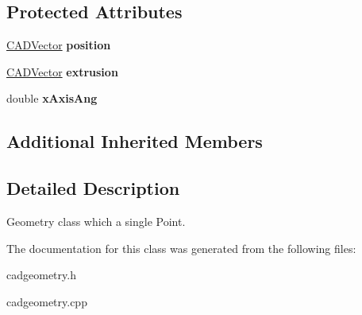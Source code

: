 \subsection*{Protected Attributes}
\begin{DoxyCompactItemize}
\item 
\hyperlink{class_c_a_d_vector}{C\+A\+D\+Vector} {\bfseries position}\hypertarget{class_c_a_d_point3_d_a0ebb31ec5b9d7744849099d4f618f0f4}{}\label{class_c_a_d_point3_d_a0ebb31ec5b9d7744849099d4f618f0f4}

\item 
\hyperlink{class_c_a_d_vector}{C\+A\+D\+Vector} {\bfseries extrusion}\hypertarget{class_c_a_d_point3_d_a6d4e4c354ce97bd62c9db60feb3c74f9}{}\label{class_c_a_d_point3_d_a6d4e4c354ce97bd62c9db60feb3c74f9}

\item 
double {\bfseries x\+Axis\+Ang}\hypertarget{class_c_a_d_point3_d_a351cfb9e2f3dd6e74b2ba1746ce5d174}{}\label{class_c_a_d_point3_d_a351cfb9e2f3dd6e74b2ba1746ce5d174}

\end{DoxyCompactItemize}
\subsection*{Additional Inherited Members}


\subsection{Detailed Description}
Geometry class which a single Point. 

The documentation for this class was generated from the following files\+:\begin{DoxyCompactItemize}
\item 
cadgeometry.\+h\item 
cadgeometry.\+cpp\end{DoxyCompactItemize}

